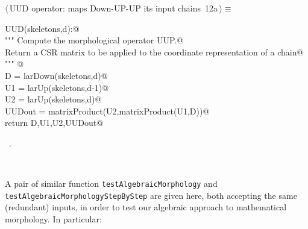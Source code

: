 \documentclass[11pt,oneside]{article}	%
\begin{document}
\begin{flushleft} \small
\begin{minipage}{\linewidth} \label{scrap18}
\protect{}$\langle\,$UUD operator: maps Down-UP-UP its input chains\nobreak\ {\footnotesize 12a}$\,\rangle\equiv$
\vspace{-1ex}
\begin{list}{}{} \item
\mbox{}\verb@def UUD(skeletons,d):@\\
\mbox{}\verb@   """ Compute the morphological operator UUP.@\\
\mbox{}\verb@      Return a CSR matrix to be applied to the coordinate representation of a chain@\\
\mbox{}\verb@   """ @\\
\mbox{}\verb@   D = larDown(skeletons,d)@\\
\mbox{}\verb@   U1 = larUp(skeletons,d-1)@\\
\mbox{}\verb@   U2 = larUp(skeletons,d)@\\
\mbox{}\verb@   UUDout = matrixProduct(U2,matrixProduct(U1,D))@\\
\mbox{}\verb@   return D,U1,U2,UUDout@\\
\mbox{}\verb@@{\NWsep}
\end{list}
\vspace{-1ex}
\footnotesize\addtolength{\baselineskip}{-1ex}
\begin{list}{}{\setlength{\itemsep}{-\parsep}\setlength{\itemindent}{-\leftmargin}}
\item \NWtxtMacroRefIn\ .
\end{list}
\end{minipage}\\[4ex]
\end{flushleft}

A pair of similar function \texttt{testAlgebraicMorphology} and \texttt{testAlgebraicMorphologyStepByStep} are given here, both accepting the same (redundant) inputs, in order to test our algebraic approach to mathematical morphology. In particular: 

\end{document}
